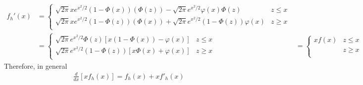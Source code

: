 \documentclass[12pt]{article}  %
\begin{document}
\begin{enumerate}
\begin{enumerate}
\begin{align*}
f_h'(x) &= \begin{cases}
\sqrt{2\pi}xe^{x^2/2}(1-\Phi(x))(\Phi(z)) -\sqrt{2\pi}e^{x^2/2}\varphi(x)\Phi(z) & z\leq x \\ 
\sqrt{2\pi}xe^{x^2/2}(1-\Phi(z))(\Phi(x)) +\sqrt{2\pi}e^{x^2/2}(1-\Phi(z))\varphi(x) & z\geq x \\
\end{cases}\\
&= \begin{cases}
\sqrt{2\pi}e^{x^2/2}\Phi(z)\left[x(1-\Phi(x)) -\varphi(x)\right]& z\leq x \\ 
\sqrt{2\pi}e^{x^2/2}(1-\Phi(z))\left[x\Phi(x) + \varphi(x)\right] & z\geq x \\
\end{cases}
&= \begin{cases}
xf(x)& z\leq x \\ 
& z\geq x \\
\end{cases}
\end{align*}
Therefore, in general 
\begin{align*}
\frac{d}{dx}[xf_h(x)] = f_h(x) + xf'_h(x)
\end{align*}

\end{enumerate}	

\end{enumerate}	
\end{document}
